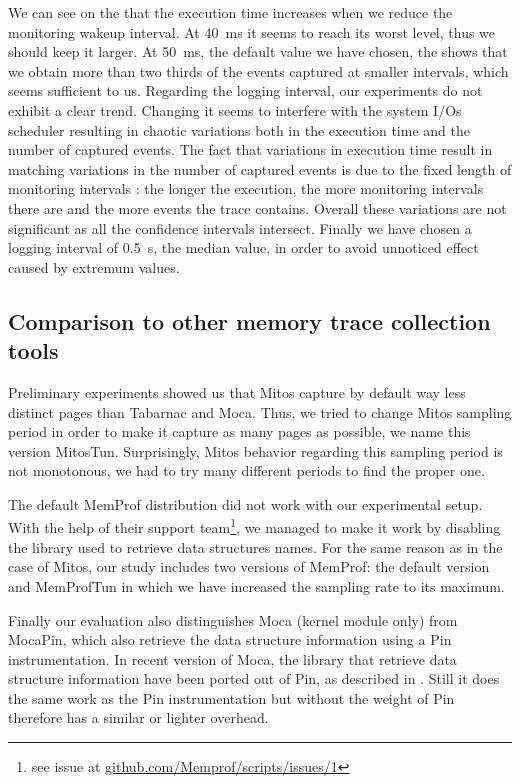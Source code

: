 We can see on the  that the execution time increases when we reduce the monitoring wakeup interval.
At \SI{40}{ms} it seems to reach its worst level, thus we should keep it larger.
At \SI{50}{ms}, the default value we have chosen, the  shows that we obtain more than two thirds of the events captured at smaller intervals, which seems sufficient to us.
Regarding the logging interval, our experiments do not exhibit a clear trend.
Changing it seems to interfere with the system I/Os scheduler resulting in chaotic variations both in the execution time and the number of captured events.
The fact that variations in execution time result in matching variations in the number of captured events is due to the fixed length of monitoring intervals : the longer the execution, the more monitoring intervals there are and the more events the trace contains.
Overall these variations are not significant as all the confidence intervals intersect.
Finally we have chosen a logging interval of \SI{0.5}{s}, the median value, in order to avoid unnoticed effect caused by extremum values.

\subsection{Comparison to other memory trace collection tools}

Preliminary experiments showed us that \gls{Mitos} capture by default way less distinct pages than \gls{Tabarnac} and \gls{Moca}.
Thus, we tried to change \gls{Mitos} sampling period in order to make it capture as many pages as possible, we name this version MitosTun.
Surprisingly, \gls{Mitos} behavior regarding this sampling period is not monotonous, we had to try many different periods to find the proper one.

The default \gls{MemProf} distribution did not work with our experimental setup.
With the help of their support team\footnote{
    see issue at \href{https://github.com/Memprof/scripts/issues/1}{github.com/Memprof/scripts/issues/1}
}, we managed to make it work by disabling the library used to retrieve data structures names.
For the same reason as in the case of \gls{Mitos}, our study includes two versions of \gls{MemProf}: the default version and MemProfTun in which we have increased the sampling rate to its maximum.

Finally our evaluation also distinguishes \gls{Moca} (kernel module only) from MocaPin, which also retrieve the data structure information using a \gls{Pin} instrumentation.
In recent version of \gls{Moca}, the library that retrieve data structure information have been ported out of \gls{Pin}, as described in .
Still it does the same work as the \gls{Pin} instrumentation but without the weight of \gls{Pin} therefore has a similar or lighter overhead.


